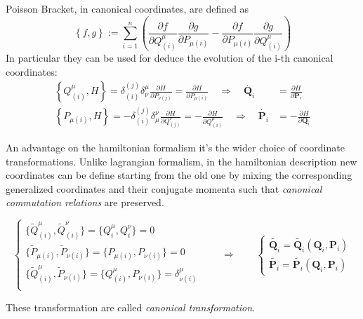 \begin{enumerate}
    Poisson Bracket, in canonical coordinates, are defined as
    \begin{equation*} \label{eq:possion_braket}
      \left\{ f, g \right\} := \sum_{i=1}^{n} \left(
        \frac{\partial f}{\partial Q^{\mu}_{(i)}}
        \frac{\partial g}{\partial P_{\mu(i)}} -
        \frac{\partial f}{\partial P_{\mu(i)}}
        \frac{\partial g}{\partial Q^{\mu}_{(i)}}
      \right)
    \end{equation*}
    In particular they can be used for deduce the evolution of the i-th
    canonical coordinates:
    \begin{align*}
      \left\{ Q^{\mu}_{(i)}, H\right\}
      = \delta^{(j)}_{(i)} \delta^{\mu}_{\nu}
          \frac{\partial H}{\partial P_{\nu(j)}}
      = \frac{\partial H}{\partial P_{\mu(i)}}
      \quad \Rightarrow \quad
      \dot{\bm{Q}_i} &=  \frac{\partial H}{\partial \bm{P}_i}
      \\
      \left\{ P_{\mu(i)}, H\right\}
      = - \delta^{(j)}_{(i)} \delta^{\nu}_{\mu}
          \frac{\partial H}{\partial Q^{\nu}_{(j)}}
      = - \frac{\partial H}{\partial Q^{\mu}_{(i)}}
      \quad \Rightarrow \quad
      \dot{\bm{P}_i} &= -\frac{\partial H}{\partial \bm{Q}_i}
    \end{align*}
\end{enumerate}
An advantage on the hamiltonian formalism it's the wider choice of coordinate
transformations. Unlike lagrangian formalism, in the hamiltonian description new
coordinates can be define starting from the old one by mixing the corresponding
generalized coordinates and their conjugate momenta such that \emph{canonical
commutation relations} are preserved.

\begin{equation*}
  \begin{cases}
    \{\tilde{Q}^{\mu}_{(i)}, \tilde{Q}^{\nu}_{(i)}\} =
    \{Q^{\mu}_{i}, Q^{\nu}_{i}\} = 0 \\
    \{\tilde{P}_{\mu(i)}, \tilde{P}_{\nu(i)}\} =
    \{P_{\mu(i)}, P_{\nu(i)}\} = 0 \\
    \{\tilde{Q}^{\mu}_{(i)}, \tilde{P}_{\nu(i)}\} =
    \{Q^{\mu}_{(i)}, P_{\nu(i)}\} = \delta^{\mu}_{\nu(i)} \\
  \end{cases}
  \qquad \Rightarrow \qquad
  \begin{cases}
    \tilde{\bm{Q}_i} = \tilde{\bm{Q}_i}(\bm{Q}_i, \bm{P}_i) \\
    \tilde{\bm{P}_i} = \tilde{\bm{P}_i}(\bm{Q}_i, \bm{P}_i)
  \end{cases}
\end{equation*}

These transformation are called \emph{canonical transformation}.
